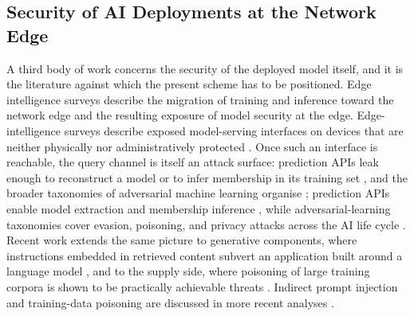 \documentclass[cmc,article,submit,moreauthors,pdftex]{Definitions/tsp}
\providecommand{\DIFadd}[1]{{\protect\color{blue} \sf #1}} %
\providecommand{\DIFdel}[1]{{\protect\color{red} \scriptsize #1}} %
\providecommand{\DIFaddbegin}{} %
\providecommand{\DIFaddend}{} %
\providecommand{\DIFdelbegin}{} %
\providecommand{\DIFdelend}{} %
\begin{document}
\DIFaddend \subsection{Security of AI Deployments at the Network Edge}\label{sec:aisec}

A third body of work concerns \DIFdelbegin \DIFdel{the security of the deployed model itself, and it is the literature against which the present scheme has to be positioned. Edge intelligence surveys describe the migration of training and inference toward the network edge and the resulting exposure of }\DIFdelend \DIFaddbegin \DIFadd{model security at the edge. Edge-intelligence surveys describe exposed }\DIFaddend model-serving interfaces \DIFdelbegin \DIFdel{on devices that are neither physically nor administratively protected \cite{zhou2019edge,deng2020edge}. Once such an interface is reachable, the query channel is itself an attack surface: prediction APIs leak enough to reconstruct a model \cite{tramer2016stealing} or to infer membership in its training set \cite{shokri2017membership}, and the broader taxonomies of adversarial machine learning organise }\DIFdelend \DIFaddbegin \DIFadd{\cite{zhou2019edge,deng2020edge}; prediction APIs enable model extraction and membership inference \cite{tramer2016stealing,shokri2017membership}, while adversarial-learning taxonomies cover }\DIFaddend evasion, poisoning, and privacy \DIFdelbegin \DIFdel{attacks across the AI life cycle \cite{papernot2018sok,biggio2018wild,nist2025aml}. Recent work extends the same picture to generative components, where instructions embedded in retrieved content subvert an application built around a language model \cite{greshake2023}, and to the supply side, where poisoning of large training corpora is shown to be practically achievable \cite{carlini2024poisoning}}\DIFdelend \DIFaddbegin \DIFadd{threats \cite{papernot2018sok,biggio2018wild,nist2025aml}. Indirect prompt injection and training-data poisoning are discussed in more recent analyses \cite{greshake2023,carlini2024poisoning}}\DIFaddend .
\end{document}
